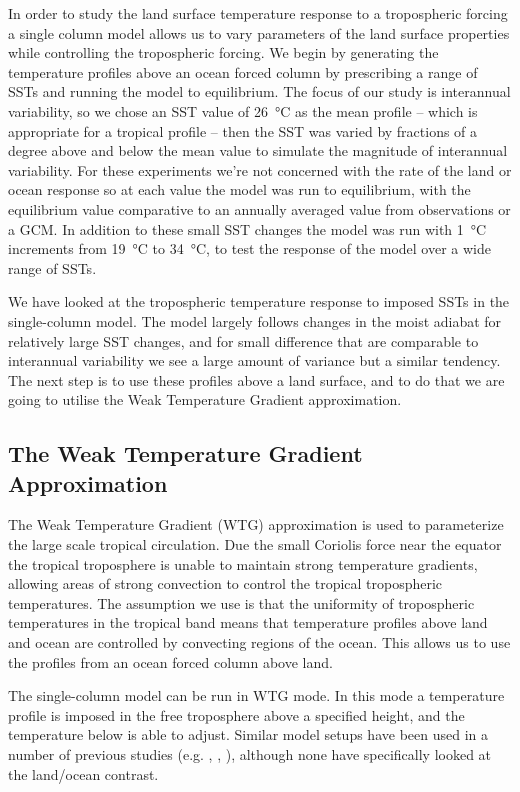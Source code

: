 In order to study the land surface temperature response to a tropospheric 
forcing a single column model allows us to vary parameters of the land surface 
properties while controlling the tropospheric forcing.  We begin by generating 
the temperature profiles above an ocean forced column by prescribing a range of SSTs 
and running the model to equilibrium.  The focus of our study is interannual 
variability, so we chose an SST value of \SI{26}{\degreeCelsius} as the mean 
profile -- which is appropriate for a tropical profile -- then the SST was 
varied by fractions of a degree above and below the mean value to simulate the 
magnitude of interannual variability. For these experiments we're not concerned 
with the rate of the land or ocean response so at each value the model was run 
to equilibrium, with the equilibrium value comparative to an annually averaged 
value from observations or a GCM.  In addition to these small SST changes the 
model was run with \SI{1}{\degreeCelsius} increments from 
\SI{19}{\degreeCelsius} to \SI{34}{\degreeCelsius}, to test the response of the 
model over a wide range of SSTs.

We have looked at the tropospheric temperature response to imposed SSTs in the 
single-column model. The model largely follows changes in the moist adiabat for 
relatively large SST changes, and for small difference that are comparable to 
interannual variability we see a large amount of variance but a similar 
tendency. The next step is to use these profiles above a land surface, and to do 
that we are going to utilise the Weak Temperature Gradient approximation.

\subsection{The Weak Temperature Gradient Approximation}
The Weak Temperature Gradient (WTG) approximation is used to parameterize the 
large scale tropical circulation. Due the small Coriolis force near the equator 
the tropical troposphere is unable to maintain strong temperature gradients, 
allowing areas of strong convection to control the tropical tropospheric 
temperatures.  The assumption we use is that the uniformity of tropospheric 
temperatures in the tropical band means that temperature profiles above land and 
ocean are controlled by convecting regions of the ocean. This allows us to use 
the profiles from an ocean forced column above land.

The single-column model can be run in WTG mode. In this mode a temperature 
profile is imposed in the free troposphere above a specified height, and the 
temperature below is able to adjust. Similar model setups have been used in a 
number of previous studies (e.g. \citealt{Sobel2000}, \citealt{Lintner2005}, 
\citealt{Ramsay2011}), although none have specifically looked at the land/ocean 
contrast.

